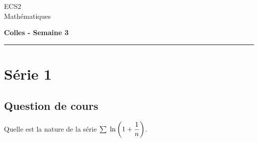 \documentclass[11pt]{article}%
\begin{document}
\begin{flushleft}
ECS2 \\
Mathématiques
\end{flushleft}

\begin{center}
\textbf{\Large{Colles - Semaine 3}}
\end{center}

\hrule

\vspace*{0,2cm}

\section*{Série 1}
\subsection*{Question de cours}
Quelle est la nature de la série ${\textstyle\sum\limits_{}^{}}\hspace{.1cm} \ln\left( 
1+\dfrac{1}{n}\right)$.
\end{document}
